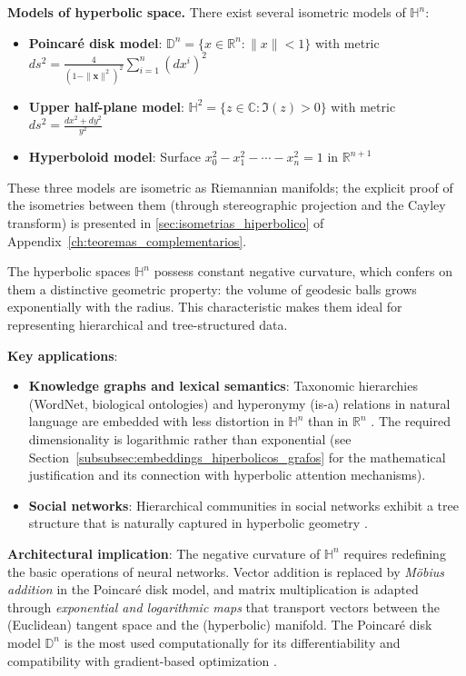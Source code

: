 \textbf{Models of hyperbolic space.}\label{rem:modelos_hiperbolico} There exist several isometric models of $\mathbb{H}^n$:
\begin{itemize}
    \item \textbf{Poincaré disk model}: $\mathbb{D}^n = \{x \in \mathbb{R}^n : \|x\| < 1\}$
          with metric $ds^2 = \frac{4}{(1 - \|\mathbf{x}\|^2)^2} \sum_{i=1}^n (dx^i)^2$
    \item \textbf{Upper half-plane model}: $\mathbb{H}^2 = \{z \in \mathbb{C} : \Im(z) > 0\}$
          with metric $ds^2 = \frac{dx^2 + dy^2}{y^2}$
    \item \textbf{Hyperboloid model}: Surface $x_0^2 - x_1^2 - \cdots - x_n^2 = 1$ in $\mathbb{R}^{n+1}$
\end{itemize}

These three models are isometric as Riemannian manifolds; the explicit proof of the isometries between them (through stereographic projection and the Cayley transform) is presented in \autoref{sec:isometrias_hiperbolico} of Appendix~\ref{ch:teoremas_complementarios}.

The hyperbolic spaces $\mathbb{H}^n$ possess constant negative curvature, which confers on them a distinctive geometric property: the volume of geodesic balls grows exponentially with the radius. This characteristic makes them ideal for representing hierarchical and tree-structured data.

\textbf{Key applications}:
\begin{itemize}
    \item \textbf{Knowledge graphs and lexical semantics}: Taxonomic hierarchies (WordNet, biological ontologies) and hyperonymy (is-a) relations in natural language are embedded with less distortion in $\mathbb{H}^n$ than in $\mathbb{R}^n$ \citep{nickel2017poincare}. The required dimensionality is logarithmic rather than exponential (see Section~\ref{subsubsec:embeddings_hiperbolicos_grafos} for the mathematical justification and its connection with hyperbolic attention mechanisms).

    \item \textbf{Social networks}: Hierarchical communities in social networks exhibit a tree structure that is naturally captured in hyperbolic geometry \citep{krioukov2010hyperbolic}.
\end{itemize}

\textbf{Architectural implication}: The negative curvature of $\mathbb{H}^n$ requires redefining the basic operations of neural networks. Vector addition is replaced by \textit{Möbius addition} in the Poincaré disk model, and matrix multiplication is adapted through \textit{exponential and logarithmic maps} that transport vectors between the (Euclidean) tangent space and the (hyperbolic) manifold. The Poincaré disk model $\mathbb{D}^n$ is the most used computationally for its differentiability and compatibility with gradient-based optimization \citep{nickel2017poincare}.

